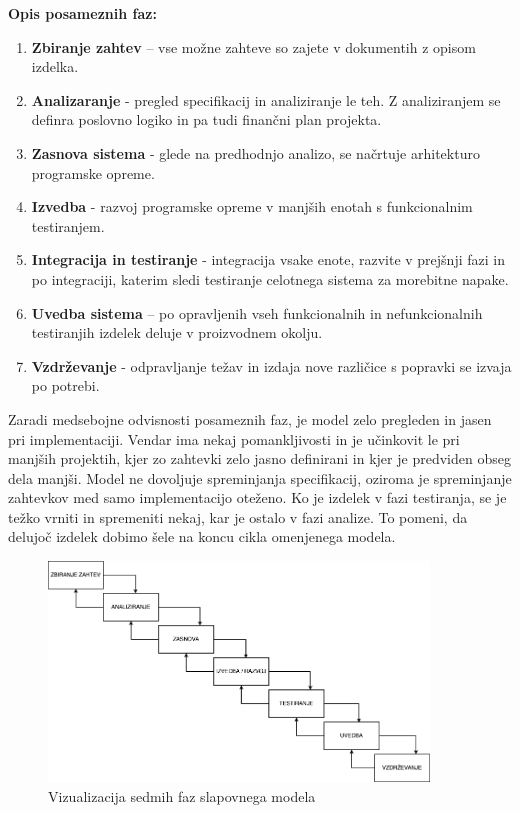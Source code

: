\documentclass[a4paper, 12pt]{book}
\begin{document}
\begin{description}
    \item \textbf{Opis posameznih faz:}
    \begin{enumerate}
        \item \textbf{Zbiranje zahtev} – vse možne zahteve so zajete v dokumentih z opisom izdelka.
        \item \textbf{Analizaranje} - pregled specifikacij in analiziranje le teh. Z analiziranjem se definra poslovno logiko in pa tudi finančni plan projekta.
        \item \textbf{Zasnova sistema} - glede na predhodnjo analizo, se načrtuje arhitekturo programske opreme.
        \item \textbf{Izvedba} - razvoj programske opreme v manjših enotah s funkcionalnim testiranjem.
        \item \textbf{Integracija in testiranje} - integracija vsake enote, razvite v prejšnji fazi in po integraciji, katerim sledi testiranje celotnega sistema za morebitne napake.
        \item \textbf{Uvedba sistema} – po opravljenih vseh funkcionalnih in nefunkcionalnih testiranjih izdelek deluje v proizvodnem okolju.
        \item \textbf{Vzdrževanje} - odpravljanje težav in izdaja nove različice s popravki se izvaja po potrebi.
    \end{enumerate}
\end{description}

Zaradi medsebojne odvisnosti posameznih faz, je model zelo pregleden in jasen pri implementaciji. Vendar ima nekaj pomankljivosti in je učinkovit le pri manjših projektih, kjer zo zahtevki zelo jasno definirani in kjer je predviden obseg dela manjši.
Model ne dovoljuje spreminjanja specifikacij, oziroma je spreminjanje zahtevkov med samo implementacijo oteženo. Ko je izdelek v fazi testiranja, se je težko vrniti in spremeniti nekaj, kar je ostalo v fazi analize.
To pomeni, da delujoč izdelek dobimo šele na koncu cikla omenjenega modela. 

\begin{figure}[h]
\begin{center}
\includegraphics[width=0.9\textwidth]{slike/waterfall.png}
\end{center}
\caption{ Vizualizacija sedmih faz slapovnega modela }
\label{waterfall-phases}
\end{figure}
\end{document}
